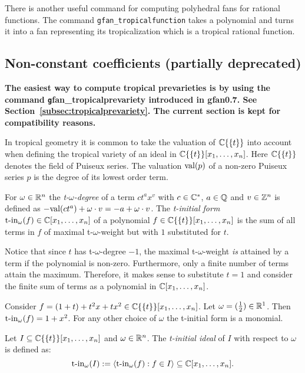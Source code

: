 There is another useful command for computing polyhedral fans for
rational functions. The command \texttt{gfan\_tropicalfunction} takes a
polynomial and turns it into a fan representing its tropicalization
which is a tropical rational function.

\subsection{Non-constant coefficients (partially deprecated)}
\label{sec:non-constant}
{\bf The easiest way to compute tropical prevarieties is by using the command {\texttt gfan\_tropicalprevariety} introduced in gfan0.7. See Section~\ref{subsec:tropicalprevariety}. The current section is kept for compatibility reasons.}

In tropical geometry it is common to take the valuation of
$\mathbb{C}\{\{t\}\}$ into account when defining the tropical variety of
an ideal in $\mathbb{C}\{\{t\}\}[x_1,\dots,x_n]$.  Here $\mathbb{C}\{\{t\}\}$ denotes the field of
Puiseux series. The valuation $\textup{val}(p)$ of a non-zero Puiseux
series $p$ is the degree of its lowest order term.


\begin{definition}
\label{def:tomegadegree}
For $\omega\in\mathbb{R}^n$ the \emph{t-$\omega$-degree} of a term $ct^ax^v$
with $c\in\mathbb{C}^*$, $a\in \mathbb{Q}$ and $v\in\mathbb{Z}^n$ is defined as
$-\textup{val}(ct^a)+\omega\cdot v=-a+\omega\cdot v$.  The \emph{t-initial
form} $\textup{t-in}_\omega(f)\in\mathbb{C}[x_1,\dots,x_n]$ of a polynomial
$f\in{\ensuremath{\mathbb{C}\{\{t\}\}} }[x_1,\dots,x_n]$ is the sum of all terms in $f$ of maximal
t-$\omega$-weight but with $1$ substituted for $t$.
\end{definition}
\begin{remark}
Notice that since $t$ has t-$\omega$-degree $-1$, the maximal
t-$\omega$-weight \emph{is} attained by a term if the polynomial is
non-zero. Furthermore, only a finite number of terms attain the
maximum. Therefore, it makes sense to substitute $t=1$ and consider
the finite sum of terms as a polynomial in $\mathbb{C}[x_1,\dots,x_n]$.
\end{remark}
\begin{example}
Consider $f=(1+t)+t^2x+tx^2\in{\ensuremath{\mathbb{C}\{\{t\}\}} }[x_1,\dots,x_n]$. Let $\omega=({1\over
2})\in\mathbb{R}^1$. Then $\textup{t-in}_\omega(f)=1+x^2$. For any
other choice of $\omega$ the t-initial form is a monomial.
\end{example}
\begin{definition}
Let $I\subseteq {\ensuremath{\mathbb{C}\{\{t\}\}} }[x_1,\dots,x_n]$ and $\omega\in\mathbb{R}^n$. The \emph{t-initial ideal} of $I$ with respect to $\omega$ is defined as:
$$\textup{t-in}_\omega(I):=\langle \textup{t-in}_\omega(f):f\in I\rangle\subseteq\mathbb{C}[x_1,\dots,x_n].$$
\end{definition}

